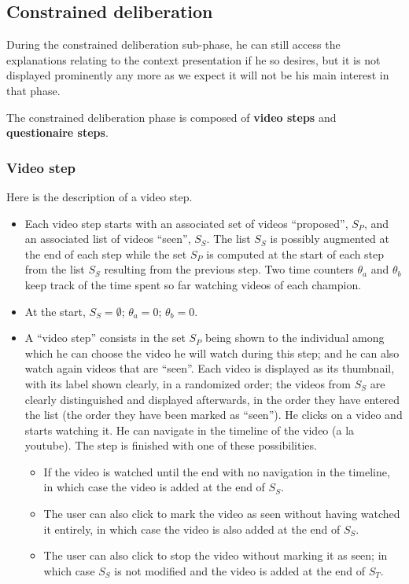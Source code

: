 \documentclass[version=3.21, pagesize, twoside=off, bibliography=totoc, DIV=calc, fontsize=12pt, a4paper]{scrartcl}
\begin{document}
\subsection{Constrained deliberation}
During the constrained deliberation sub-phase, he can still access the explanations relating to the context presentation if he so desires, but it is not displayed prominently any more as we expect it will not be his main interest in that phase.

The constrained deliberation phase is composed of \textbf{video steps} and \textbf{questionaire steps}. 

\subsubsection{Video step}
Here is the description of a video step.
\begin{itemize}
	\item Each video step starts with an associated set of videos “proposed”, $S_P$, and an associated list of videos “seen”, $S_S$. The list $S_S$ is possibly augmented at the end of each step while the set $S_P$ is computed at the start of each step from the list $S_S$ resulting from the previous step. Two time counters $\theta_a$ and $\theta_b$ keep track of the time spent so far watching videos of each champion.
	\item At the start, $S_S = \emptyset$; $\theta_a = 0$; $\theta_b = 0$.
	\item A “video step” consists in the set $S_P$ being shown to the individual among which he can choose the video he will watch during this step; and he can also watch again videos that are “seen”. Each video is displayed as its thumbnail, with its label shown clearly, in a randomized order; the videos from $S_S$ are clearly distinguished and displayed afterwards, in the order they have entered the list (the order they have been marked as “seen”). He clicks on a video and starts watching it. 
He can navigate in the timeline of the video (a la youtube).
The step is finished with one of these possibilities.
	\begin{itemize}
		\item If the video is watched until the end with no navigation in the timeline, in which case the video is added at the end of $S_S$. 
		\item The user can also click to mark the video as seen without having watched it entirely, in which case the video is also added at the end of $S_S$.
		\item The user can also click to stop the video without marking it as seen; in which case $S_S$ is not modified and the video is added at the end of $S_T$. 

\end{itemize}
\end{itemize}
\end{document}
